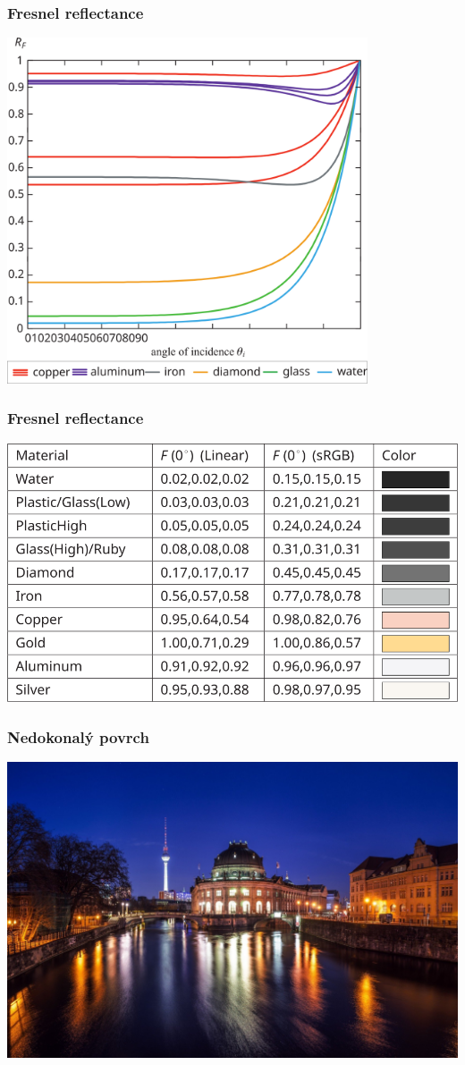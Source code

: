 \begin{frame}
    \frametitle{Fresnel reflectance}
    \includegraphics[width=0.8\textwidth]{pics/physicallyBasedRendering/fresnel_reflectance}
\end{frame}

\begin{frame}
    \frametitle{Fresnel reflectance}
    \includegraphics[width=\textwidth]{pics/physicallyBasedRendering/fresnel_reflectance_table}
\end{frame}

\begin{frame}
    \frametitle{Nedokonalý povrch}
    \includegraphics[width=\textwidth]{pics/physicallyBasedRendering/night-reflect}
\end{frame}

